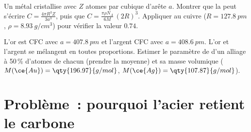 \begin{exercise}[$\star\star\star$]\label{exo:b1:crystals-metals:11}
Un métal cristallise avec $Z$ atomes par  cubique d'arête $a$.
Montrer que la  peut s'écrire $C = \frac{4\pi R^3 Z}{3a^3}$,
puis que
$C = \frac{\pi\rho N_A}{6M}\,(2R)^3$. Appliquer au cuivre ($R = \qty{127.8}{pm}$,
$\rho = \qty{8.93}{g/cm^3}$) pour vérifier la valeur $0.74$.
\end{exercise}

\begin{exercise}[$\star\star\star$]\label{exo:b1:crystals-metals:12}
L'or est CFC avec $a = \qty{407.8}{pm}$ et l'argent CFC avec
$a = \qty{408.6}{pm}$. L'or et l'argent se mélangent en toutes
proportions. Estimer le paramètre de  d'un alliage à 50\,\%
d'atomes de chacun (prendre la moyenne) et sa masse volumique
($M(\ce{Au}) = \qty{196.97}{g/mol}$,
$M(\ce{Ag}) = \qty{107.87}{g/mol}$).
\end{exercise}

\section{Problème~: pourquoi l'acier retient le carbone}

